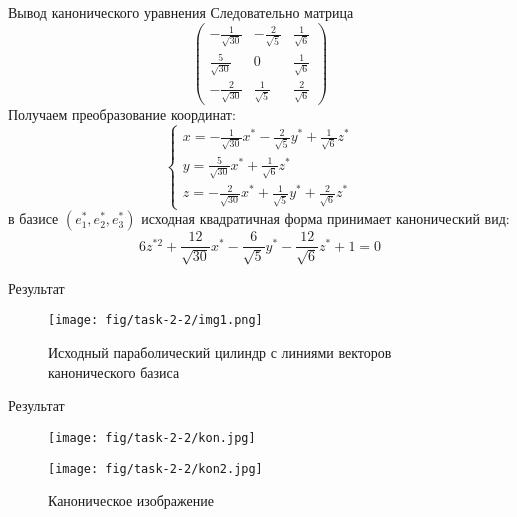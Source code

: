 \begin{frame}{Вывод канонического уравнения}
    Следовательно матрица
   $$
    \left(\begin{array}{ccc}
    -\frac{1}{\sqrt{30}} & -\frac{2}{\sqrt{5}} & \frac{1}{\sqrt{6}} \\
    \frac{5}{\sqrt{30}} & 0 & \frac{1}{\sqrt{6}} \\
    -\frac{2}{\sqrt{30}} & \frac{1}{\sqrt{5}} & \frac{2}{\sqrt{6}}
    \end{array}\right)
    $$
    Получаем преобразование координат:
    $$
    \left\{\begin{array}{l}
    x=-\frac{1}{\sqrt{30}} x^{*} - \frac{2}{\sqrt{5}} y^{*}+\frac{1}{\sqrt{6}} z^{*} \\
    y=\frac{5}{\sqrt{30}} x^{*} + \frac{1}{\sqrt{6}} z^{*} \\
    z=-\frac{2}{\sqrt{30}} x^{*} + \frac{1}{\sqrt{5}} y^{*} + \frac{2}{\sqrt{6}} z^{*}
    \end{array}\right.
    $$
    в базисе $\left(e_{1}^{*},e_{2}^{*},e_{3}^{*}\right)$ исходная квадратичная форма принимает канонический вид:
    $$
    6 z^{* 2} + \frac{12}{\sqrt{30}}x^{*} - \frac{6}{\sqrt{5}}y^{*} -\frac{12}{\sqrt{6}}z^{*} + 1 = 0
    $$
\end{frame}
\begin{frame}{Результат}
    \begin{figure}
        \centering
        \texttt{[image: fig/task-2-2/img1.png]}
        \caption{Исходный параболический цилиндр с линиями векторов канонического базиса}
    \end{figure}
\end{frame}
\begin{frame}{Результат}

    \begin{figure}
        \begin{minipage}{.49\textwidth}
            \centering
            \texttt{[image: fig/task-2-2/kon.jpg]}
        \end{minipage}
        \begin{minipage}{.49\textwidth}
            \centering
            \texttt{[image: fig/task-2-2/kon2.jpg]}
        \end{minipage}
        \caption{Каноническое изображение}
    \end{figure}
\end{frame}
